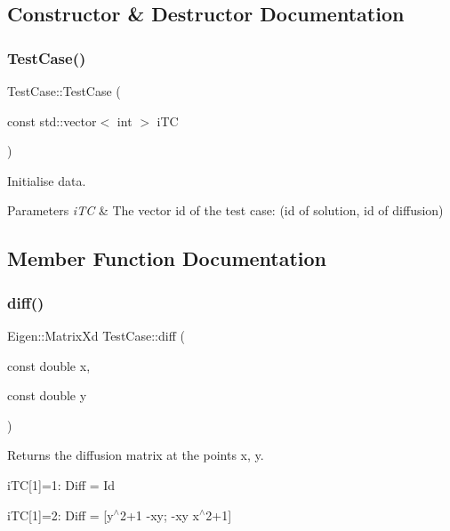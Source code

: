 \subsection{Constructor \& Destructor Documentation}
\mbox{\label{classTestCase_aa4ad29533416ee515205db87002a1bf1}} 
\subsubsection{\texorpdfstring{Test\+Case()}{TestCase()}}
{\footnotesize\ttfamily Test\+Case\+::\+Test\+Case (\begin{DoxyParamCaption}\item[{const std\+::vector$<$ int $>$}]{i\+TC }\end{DoxyParamCaption})}



Initialise data. 


\begin{DoxyParams}{Parameters}
{\em i\+TC} & The vector id of the test case\+: (id of solution, id of diffusion) \\
\hline
\end{DoxyParams}


\subsection{Member Function Documentation}
\mbox{\label{classTestCase_a74093020578afb0e658ae1dc77011b8a}} 
\subsubsection{\texorpdfstring{diff()}{diff()}}
{\footnotesize\ttfamily Eigen\+::\+Matrix\+Xd Test\+Case\+::diff (\begin{DoxyParamCaption}\item[{const double}]{x,  }\item[{const double}]{y }\end{DoxyParamCaption})}



Returns the diffusion matrix at the points x, y. 

i\+TC\mbox{[}1\mbox{]}=1\+: Diff = Id

i\+TC\mbox{[}1\mbox{]}=2\+: Diff = \mbox{[}y$^\wedge$2+1 -\/xy; -\/xy x$^\wedge$2+1\mbox{]}

